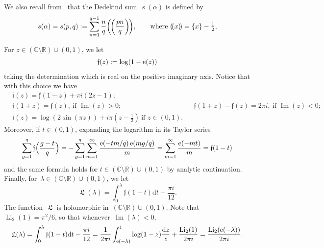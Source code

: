 \documentclass[11pt]{amsart}
\newcommand{\R}{\mathbb{R}}
\newcommand{\C}{\mathbb{C}}
\newcommand{\lf}{{\mathfrak f}}
\theoremstyle{definition}
\newcommand{\pr}[1]{\mathchoice{\left( #1\right)}{(#1)}{(#1)}{(#1)}}
\newcommand{\e}[1][]{\ifthenelse{\equal{#1}{}}{{\rm e}}{\operatorname{e}\pr{ #1}}}
\newcommand{\df}{\mathrm{d}}
\DeclareMathOperator{\Li}{Li}
\DeclareMathOperator{\Lie}{{\mathfrak L}}
\DeclareMathOperator{\deks}{s}
\renewcommand\Im{\operatorname{Im}}
\newcommand{\1}{{\mathbf 1}}
\newcommand{\syf}[1]{\left(\!\left(#1\right)\!\right)}
\let\originalleft\left
\let\originalright\right
\renewcommand{\left}{\mathopen{}\mathclose\bgroup\originalleft}
\renewcommand{\right}{\aftergroup\egroup\originalright}
\numberwithin{equation}{section}
\begin{document}
We also recall from~\cite[p.45]{Iwaniec1997} that the Dedekind sum~$\deks(\alpha)$ is defined by
\begin{equation}
s(\alpha)= s(p, q) := \sum_{n=1}^{q-1} \frac{n}q \syf{\frac{pn}{q}}, \qquad \text{where }\syf{x} = \{x\} - \tfrac12,\label{eq:def-dedekind}
\end{equation}

For $z\in (\C \setminus \R)\cup(0,1)$, we let
\begin{equation}\label{eq:deff}
  \lf(z) := \log(1-\e[z])
\end{equation} 
taking the determination which is real on the positive imaginary axis. Notice that with this choice we have
\begin{align}
  &\lf(z)=\lf(1-z)+\pi i (2z-1); &&\label{ff1}\\
  &\lf(1+z)=\lf(z), \  \text{if }\Im(z)>0; && \lf(1+z)-\lf(z)=2\pi i, \  \text{if }\Im(z)<0;\label{ff2}\\
  &\lf(z)=\log(2\sin(\pi z))+ i\pi  (z-\tfrac12) \  \text{if }z\in(0,1).\label{ff3} 
\end{align}
Moreover, if $t\in(0,1)$, expanding the logarithm in its Taylor series
\begin{equation}\label{ff4}
  \sum_{g=1}^{q} \lf\Big(\frac{g-t}q\Big)=-\sum_{g=1}^{q}\sum_{m=1}^\infty\frac{\e[-tm/q]\e[mg/q]}{m}=\sum_{m=1}^\infty\frac{\e[-mt]}{m}=\lf(1-t)
\end{equation}
and the same formula holds for $t\in(\C \setminus \R)\cup(0,1)$ by analytic continuation.
Finally, for~$\lambda\in(\C \setminus \R)\cup(0,1)$, we let
\begin{equation}\label{dig}
  \Lie(\lambda) = \int_0^\lambda \lf(1-t)\df t - \frac{\pi i}{12}.
\end{equation}
The function~$\Lie$ is holomorphic in~$(\C \setminus \R)\cup(0,1)$. Note that~$\Li_2(1) = \pi^2/6$, so that whenever~$\Im(\lambda)<0$,
\begin{equation*}
\Lie(\lambda) = \int_0^\lambda \lf(1-t)\df t - \frac{\pi i}{12} = \frac1{2\pi i}\int_{\e[-\lambda]}^1 \log(1-z) \frac{\df z}z + \frac{\Li_2(1)}{2\pi i} =\frac{\Li_2(\e[-\lambda])}{2\pi i}.
\end{equation*}
\end{document}
